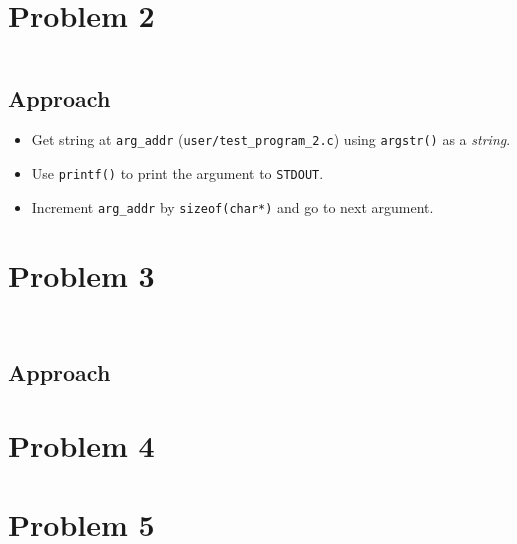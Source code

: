 \documentclass[11pt,a4paper,english]{paper}
\newenvironment{colorboxed}[4][gray]{
\begin{tcolorbox}[colback=#1!3!white,colframe=#1(ryb)!50!black,title=\textbf{#2: #3},#4]
}{
\end{tcolorbox}
}
\begin{document}
\section*{Problem 2}
\begin{colorboxed}{Code}{\texttt{kernel/sysproc.c::\textit{sys\_echo\_kernel()}}}{unbreakable}
    \inputminted[baselinestretch=0.85,firstline=91,lastline=112,breaklines]{c}{kernel/sysproc.c}
\end{colorboxed}
\subsection*{Approach}
\begin{itemize}[noitemsep, nolistsep]
    \item Get string at \texttt{arg\_addr} (\texttt{user/test\_program\_2.c}) using \texttt{argstr()} as a \textit{string}.
    \item Use \texttt{printf()} to print the argument to \texttt{STDOUT}.
    \item Increment \texttt{arg\_addr} by \texttt{sizeof(char*)} and go to next argument.
\end{itemize}
\section*{Problem 3}
\begin{colorboxed}{Code}{\texttt{kernel/sysproc.c::\textit{sys\_trace()}}}{unbreakable}
    \inputminted[baselinestretch=0.85,firstline=114,lastline=120,breaklines]{c}{kernel/sysproc.c}
\end{colorboxed}
\begin{colorboxed}{Code}{\texttt{kernel/syscall.c::\textit{syscall()}}}{unbreakable}
    \inputminted[baselinestretch=0.85,firstline=153,lastline=170,breaklines]{c}{kernel/syscall.c}
\end{colorboxed}
\subsection*{Approach}
\section*{Problem 4}
\section*{Problem 5}



%
%
\end{document}
